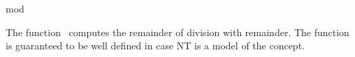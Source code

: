\begin{ccRefFunction}{mod}

\ccDefinition

The function \ccRefName\ computes the remainder of division with remainder. 
The function is guaranteed to be well defined in case NT 
is a model of the  concept. 



\ccSeeAlso

\\
\\
\\
\\

\end{ccRefFunction}